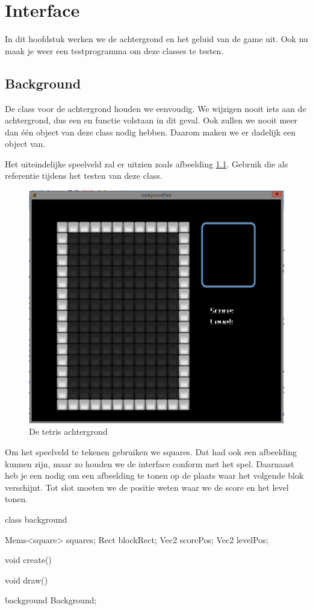 \chapter{Interface}

In dit hoofdstuk werken we de achtergrond en het geluid van de game uit. Ook nu maak je weer een testprogramma om deze classes te testen.

\section{Background}
De class voor de achtergrond houden we eenvoudig. We wijzigen nooit iets aan de achtergrond, dus een  en  functie volstaan in dit geval. Ook zullen we nooit meer dan \'e\'en object van deze class nodig hebben. Daarom maken we er dadelijk een object van.

Het uiteindelijke speelveld zal er uitzien zoals afbeelding \ref{fig:tetris_background}. Gebruik die als referentie tijdens het testen van deze class.

\begin{figure}[ht]
\centering
\includegraphics[width=0.6\linewidth]{../images/tetris_background.png}
\caption[]{De tetris achtergrond}
\label{fig:tetris_background}
\end{figure}

Om het speelveld te tekenen gebruiken we squares. Dat had ook een afbeelding kunnen zijn, maar zo houden we de interface conform met het spel. Daarnaast heb je een  nodig om een afbeelding te tonen op de plaats waar het volgende blok verschijnt. Tot slot moeten we de positie weten waar we de score en het level tonen.

\begin{code}
class background
{
   Mems<square> squares;
   Rect blockRect;
   Vec2 scorePos;
   Vec2 levelPos;
   
   void create()
   {
   }
   
   void draw()
   {
   }
}

background Background;
\end{code}

